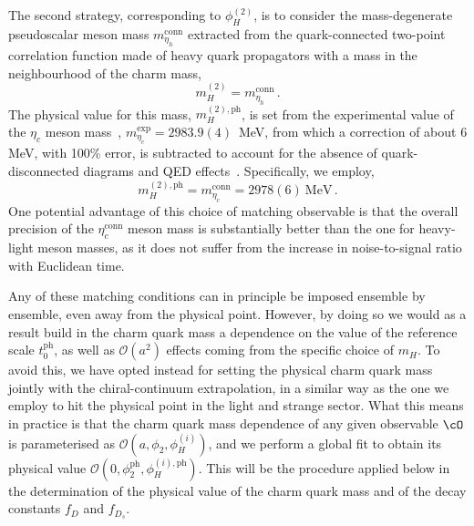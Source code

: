 The second strategy, corresponding to $\phi_H^{(2)}$, is to consider the mass-degenerate pseudoscalar meson mass $m_{\eta_h}^{\mathrm{conn}}$ extracted from the quark-connected two-point correlation function made of heavy quark propagators with a mass in the neighbourhood of the charm mass,
%
\begin{equation}
  m_H^{(2)} = m_{\eta_h}^{\mathrm{conn}}\,.
\label{eq:etac_matching}
\end{equation}
%
The physical value for this mass, $m_H^{(2), \mathrm{ph}}$,  is set from the experimental value of the $\eta_c$ meson mass~\cite{ParticleDataGroup:2022pth}, $m_{\eta_c}^{\mathrm{exp}} = 2983.9(4)\,$ MeV, from which a correction of about 6 MeV, with 100\% error, is subtracted to account for the absence of quark-disconnected diagrams and QED effects~\cite{deForcrand:2004ia, Donald:2012ga,Colquhoun:2015oha,Hatton:2020qhk,Colquhoun:2023zbc}. Specifically, we employ, 
%
\begin{equation}
  m_H^{(2), \mathrm{ph}} = m_{\eta_c}^{\mathrm{conn}} = 2978(6) \ \mathrm{MeV}\,.
\end{equation}
%
One potential advantage of this choice of matching observable is that the overall precision of the $\eta_c^{\mathrm{conn}}$ meson mass is substantially better than the one for heavy-light meson masses, as it does not suffer from the increase in noise-to-signal ratio with Euclidean time.
%

%
Any of these matching conditions can in principle be imposed ensemble by ensemble, even away from the physical point.
%
However, by doing so we would as a result build in the charm quark mass a dependence on the value of the reference scale $t_0^{\mathrm{ph}}$, as well as $\mathcal{O}(a^2)$ effects coming from the specific choice of $m_H$.
%
To avoid this, we have opted instead for setting the physical charm quark mass jointly with the chiral-continuum extrapolation, in a similar way as the one we employ to hit the physical point in the light and strange sector.
%
What this means in practice is that the charm quark mass dependence of any given observable $\cO$ is parameterised as $\mathcal{O}(a, \phi_2, \phi_H^{(i)})$, and we perform a global fit to obtain its physical value $\mathcal{O}(0, \phi_2^{\mathrm{ph}}, \phi_H^{(i),\mathrm{ph}})$.
%
This will be the procedure applied below in the determination of the physical value of the charm quark mass and of the decay constants $f_D$ and $f_{D_s}$.
%


